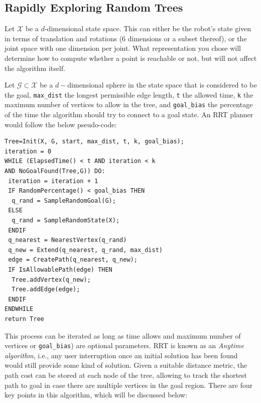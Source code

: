 \subsection{Rapidly Exploring Random Trees}

Let $ \mathcal{X}$ be a $d$-dimensional state space. This can either be the robot's state given in terms of translation and rotations ($6$ dimensions or a subset thereof), or the joint space with one dimension per joint. What representation you chose will determine how to compute whether a point is reachable or not, but will not affect the algorithm itself. 

Let $ \mathcal{G} \subset \mathcal{X}$ be a $d-$dimensional sphere in the state space that is considered to be the goal, \texttt{max\_dist} the longest permissible edge length, \texttt{t} the allowed time, \texttt{k} the maximum number of vertices to allow in the tree, and \texttt{goal\_bias} the percentage of the time the algorithm should try to connect to a goal state. An RRT planner would follow the below pseudo-code:

\begin{center}
\begin{minipage}{0.8\linewidth}
\begin{verbatim}
Tree=Init(X, G, start, max_dist, t, k, goal_bias);
iteration = 0
WHILE (ElapsedTime() < t AND iteration < k 
AND NoGoalFound(Tree,G)) DO:
 iteration = iteration + 1
 IF RandomPercentage() < goal_bias THEN
  q_rand = SampleRandomGoal(G);
 ELSE
  q_rand = SampleRandomState(X);
 ENDIF
 q_nearest = NearestVertex(q_rand)
 q_new = Extend(q_nearest, q_rand, max_dist)
 edge = CreatePath(q_nearest, q_new);
 IF IsAllowablePath(edge) THEN
  Tree.addVertex(q_new);
  Tree.addEdge(edge);
 ENDIF
ENDWHILE
return Tree
\end{verbatim}
\end{minipage}
\end{center}

This process can be iterated as long as time allows and maximum number of vertices or \texttt{goal\_bias}) are optional parameters. RRT is known as an \textsl{Anytime algorithm}, i.e., any user interruption once an initial solution has been found would still provide some kind of solution. Given a suitable distance metric, the path cost can be stored at each node of the tree, allowing to track the shortest path to goal in case there are multiple vertices in the goal region.
There are four key points in this algorithm, which will be discussed below:

